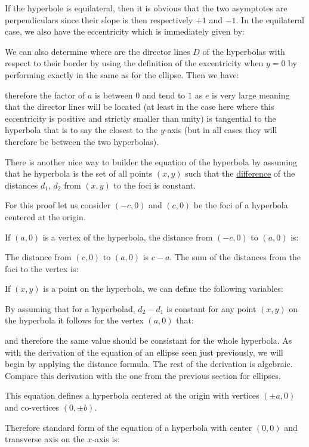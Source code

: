 	If the hyperbole is equilateral, then it is obvious that the two asymptotes are perpendiculars since their slope is then respectively $+1$ and $-1$. In the equilateral case, we also have the eccentricity which is immediately given by:
	
	We can also determine where are the director lines $D$ of the hyperbolas with respect to their border by using the definition of the excentricity when $y=0$ by performing exactly in the same as for the ellipse. Then we have:
	
	therefore the factor of $a$ is between $0$ and tend to $1$ as $e$ is very large meaning that the director lines will be located (at least in the case here where this eccentricity is positive and strictly smaller than unity) is tangential to the hyperbola that is to say the closest to the $y$-axis (but in all cases they will therefore be between the two hyperbolas).
	
	There is another nice way to builder the equation of the hyperbola by assuming that he hyperbola is the set of all points $(x,y)$ such that the \underline{difference} of the distances $d_1$, $d_2$ from $(x,y)$ to the foci is constant.

	For this proof let us consider $(-c,0)$ and $(c,0)$ be the foci of a hyperbola centered at the origin.

	If $(a,0)$ is a vertex of the hyperbola, the distance from $(-c,0)$ to $(a,0)$ is:
	
	The distance from $(c,0)$ to $(a,0)$ is $c-a$. The sum of the distances from the foci to the vertex is:
	
	If $(x,y)$ is a point on the hyperbola, we can define the following variables:
	
	By assuming that for a hyperbolad, $d_2-d_1$ is constant for any point $(x,y)$ on the hyperbola it follows for the vertex $(a,0)$ that:
	
	and therefore the same value should be consistant for the whole hyperbola.  As with the derivation of the equation of an ellipse seen just previously, we will begin by applying the distance formula. The rest of the derivation is algebraic. Compare this derivation with the one from the previous section for ellipses.
	
	This equation defines a hyperbola centered at the origin with vertices $(\pm a,0)$ and co-vertices $(0,\pm b)$.
	
	Therefore standard form of the equation of a hyperbola with center $(0,0)$ and transverse axis on the $x$-axis is:
	
